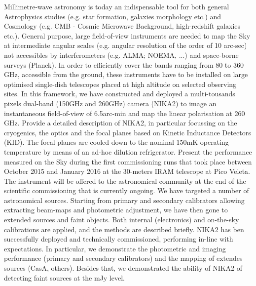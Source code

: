 \documentclass[]{aa} %
\begin{document}
  \abstract
   {Millimetre-wave astronomy is today an indispensable tool for both general Astrophysics studies (e.g. star formation, galaxies morphology etc.) and Cosmology (e.g. CMB - Cosmic Microwave Background, high-redshift galaxies etc.). General purpose, large field-of-view instruments are needed to map the Sky at intermediate angular scales (e.g. angular resolution of the order of 10 arc-sec) not accessibles by interferometers (e.g. ALMA; NOEMA, ...) and space-borne surveys (Planck). In order to efficiently cover the bands ranging from 80 to 360 GHz, accessible from the ground, these instruments have to be installed on large optimised single-dish telescopes placed at high altitude on selected observing sites. In this framework, we have constructed and deployed a multi-tousands pixels dual-band (150GHz and 260GHz) camera (NIKA2) to image an instantaneous field-of-view of 6.5arc-min and map the linear polarisation at 260 GHz.}
   {Provide a detailed description of NIKA2, in particular focussing on the cryogenics, the optics  and the focal planes based on Kinetic Inductance Detectors (KID). The focal planes are cooled down to the nominal 150mK operating temperature by means of an ad-hoc dilution refrigerator. 
Present the performance measured on the Sky during the first commissioning runs that took place between October 2015 and January 2016 at the 30-meters IRAM telescope at Pico Veleta. The instrument will be offered to the astronomical community at the end of the scientific commissioning that is currently ongoing.}
   {We have targeted a number of astronomical sources. Starting from primary and secondary calibrators allowing extracting beam-maps and photometric adjustment, we have then gone to extended sources and faint objects. Both internal (electronics) and on-the-sky calibrations are applied, and the methods are described briefly.}
   {NIKA2 has ben successfully deployed and technically commissioned, performing in-line with expectations. In particular, we demonstrate the photometric and imaging performance (primary and secondary calibrators) and the mapping of extendes sources (CasA, others). Besides that, we demonstrated the ability of NIKA2 of detecting faint sources at the mJy level.
}
   {}


\end{document}
